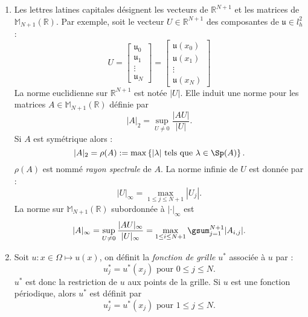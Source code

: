 \begin{enumerate}
\item Les lettres latines capitales désignent les vecteurs de $\mathbb{R}^{N+1}$ et les matrices de $\mathbb{M}_{N+1}(\mathbb{R})$. Par exemple, soit le vecteur $U \in \mathbb{R}^{N+1}$ des composantes de $\mathfrak{u} \in l^2_h$ :
\begin{equation}
U = \begin{bmatrix}
\mathfrak{u}_0 \\ \mathfrak{u}_1 \\ \vdots \\ \mathfrak{u}_N
\end{bmatrix} =
\begin{bmatrix}
\mathfrak{u}(x_0) \\ \mathfrak{u}(x_1) \\ \vdots \\ \mathfrak{u}(x_N)
\end{bmatrix}
\end{equation}
La norme euclidienne sur $\mathbb{R}^{N+1}$ est notée $|U|$. Elle induit une norme pour les matrices $A \in \mathbb{M}_{N+1}(\mathbb{R})$ définie par
\begin{equation}
|A|_2 = \sup_{U \neq 0} \dfrac{|AU|}{|U|}.
\end{equation}
Si $A$ est symétrique alors :
\begin{equation}
|A|_2 = \rho(A) := \max \left\lbrace |\lambda| \text{ tels que } \lambda \in \Sp (A) \right\rbrace.
\end{equation}
$\rho(A)$ est nommé \textit{rayon spectrale} de $A$.
La norme infinie de $U$ est donnée par :
\begin{equation}
|U|_{\infty} = \max_{1 \leq j \leq N+1} |U_j|.
\end{equation}
La norme sur $\mathbb{M}_{N+1}(\mathbb{R})$ subordonnée à $|\cdot|_{\infty}$ est
\begin{equation}
|A|_{\infty} = \sup_{U \neq 0} \dfrac{|AU|_{\infty}}{|U|_{\infty}} = \max_{1 \leq i \leq N+1} \gsum_{j=1}^{N+1} |A_{i,j}|.
\end{equation}



\item Soit $u: x \in \Omega \mapsto u(x)$, on définit la \textit{fonction de grille} $u^*$ associée à $u$ par :
\begin{equation}
u^*_j = u^*(x_j) \text{ pour } 0 \leq j \leq N.
\end{equation}
$u^*$ est donc la restriction de $u$ aux points de la grille. Si $u$ est une fonction périodique, alors $u^*$ est définit par
\begin{equation}
u^*_j = u^*(x_j) \text{ pour } 1 \leq j \leq N.
\end{equation}
\end{enumerate}

